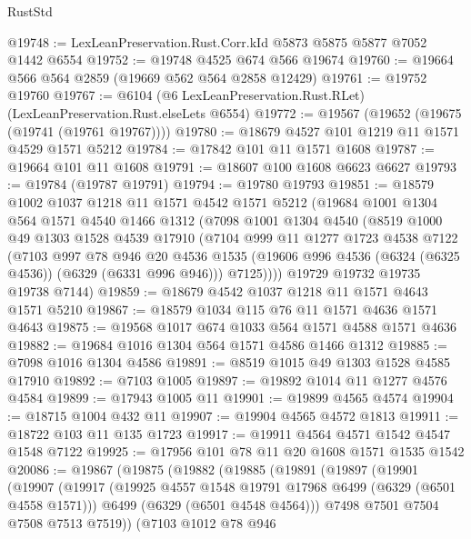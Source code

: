 \begin{lexlean}{RustStd}
\begin{coremodule}
{{@19748 := LexLeanPreservation.Rust.Corr.kId @5873 @5875 @5877 @7052 @1442 @6554
@19752 := @19748 @4525 @674 @566 @19674
@19760 := @19664 @566 @564 @2859 (@19669 @562 @564 @2858 @12429)
@19761 := @19752 @19760
@19767 := @6104 (@6 LexLeanPreservation.Rust.RLet) (LexLeanPreservation.Rust.elseLets @6554)
@19772 := @19567 (@19652 (@19675 (@19741 (@19761 @19767))))
@19780 := @18679 @4527 @101 @1219 @11 @1571 @4529 @1571 @5212
@19784 := @17842 @101 @11 @1571 @1608
@19787 := @19664 @101 @11 @1608
@19791 := @18607 @100 @1608 @6623 @6627
@19793 := @19784 (@19787 @19791)
@19794 := @19780 @19793
@19851 := @18579
    @1002
    @1037
    @1218
    @11
    @1571
    @4542
    @1571
    @5212
    (@19684
      @1001
      @1304
      @564
      @1571
      @4540
      @1466
      @1312
      (@7098
        @1001
        @1304
        @4540
        (@8519
          @1000
          @49
          @1303
          @1528
          @4539
          @17910
          (@7104
            @999
            @11
            @1277
            @1723
            @4538
            @7122
            (@7103
              @997
              @78
              @946
              @20
              @4536
              @1535
              (@19606 @996 @4536 (@6324 (@6325 @4536)) (@6329 (@6331 @996 @946)))
              @7125))))
      @19729
      @19732
      @19735
      @19738
      @7144)
@19859 := @18679 @4542 @1037 @1218 @11 @1571 @4643 @1571 @5210
@19867 := @18579 @1034 @115 @76 @11 @1571 @4636 @1571 @4643
@19875 := @19568 @1017 @674 @1033 @564 @1571 @4588 @1571 @4636
@19882 := @19684 @1016 @1304 @564 @1571 @4586 @1466 @1312
@19885 := @7098 @1016 @1304 @4586
@19891 := @8519 @1015 @49 @1303 @1528 @4585 @17910
@19892 := @7103 @1005
@19897 := @19892 @1014 @11 @1277 @4576 @4584
@19899 := @17943 @1005 @11
@19901 := @19899 @4565 @4574
@19904 := @18715 @1004 @432 @11
@19907 := @19904 @4565 @4572 @1813
@19911 := @18722 @103 @11 @135 @1723
@19917 := @19911 @4564 @4571 @1542 @4547 @1548 @7122
@19925 := @17956 @101 @78 @11 @20 @1608 @1571 @1535 @1542
@20086 := @19867
    (@19875
      (@19882
        (@19885
          (@19891
            (@19897
              (@19901
                (@19907
                  (@19917
                    (@19925 @4557 @1548 @19791 @17968 @6499 (@6329 (@6501 @4558 @1571)))
                    @6499
                    (@6329 (@6501 @4548 @4564)))
                  @7498
                  @7501
                  @7504
                  @7508
                  @7513
                  @7519))
              (@7103
                @1012
                @78
                @946
}}
\end{coremodule}
\end{lexlean}
